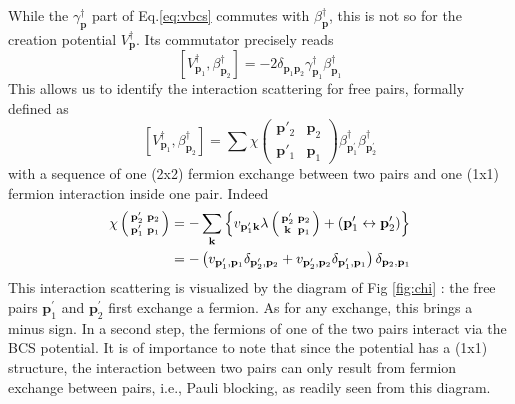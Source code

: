 \documentclass[aps,prb,superscriptaddress,twocolumn]{revtex4}
\newcommand{\vk}{\ensuremath{\mathbf{k}}}
\newcommand{\vp}{\ensuremath{\mathbf{p}}}
\begin{document}
While the $\gamma^{\dagger}_\vp$ part of Eq.\eqref{eq:vbcs} commutes with $%
\beta^{\dagger}_\vp$, this is not so for the creation potential $%
V^{\dagger}_\vp$. Its commutator precisely reads 
\begin{equation}  \label{eq:vpotbeta}
\left[V^{\dagger}_{\mathbf{p} _1},\beta^{\dagger}_{\mathbf{p} _2}\right] 
=-2\delta_{\mathbf{p} _1\mathbf{p} _2}\gamma^{\dagger}_{\mathbf{p}
_1}\beta^{\dagger}_{\mathbf{p} _1}
\end{equation}
This allows us to identify the interaction scattering for free pairs,
formally defined as 
\begin{equation}  \label{eq:vBeta}
\left[V^{\dagger}_{\mathbf{p} _1},\beta^{\dagger}_{\mathbf{p} _2}\right] 
=\sum\chi\left(\begin{smallmatrix}\vp'_2&\vp_2\\\vp'_1&\vp_1\end{smallmatrix}%
\right)  \beta^{\dagger}_{\mathbf{p} ^{\prime}_1}\beta^{\dagger}_{\mathbf{p}
^{\prime}_2}
\end{equation}
with a sequence of one (2x2) fermion exchange between two pairs and one (1x1) fermion interaction inside one pair. Indeed 
\begin{equation}  \label{eq:interactSc}
\begin{split}
\chi\left(\begin{smallmatrix}\vp'_2&\vp_2\\\vp'_1&\vp_1\end{smallmatrix}%
\right)  &=-\sum_\vk\left\{v_{\mathbf{p} ^{\prime}_1\mathbf{k} }\lambda\left(%
\begin{smallmatrix}\vp'_2&\vp_2\\\vk&\vp_1\end{smallmatrix}\right)  +\left(%
\mathbf{p} ^{\prime}_1\leftrightarrow\mathbf{p} ^{\prime}_2\right) \right\} 
\\
&=-\left(v_{\mathbf{p} ^{\prime}_1,\mathbf{p} _1}\delta_{\mathbf{p}
^{\prime}_2,\mathbf{p} _2}+v_{\mathbf{p} ^{\prime}_2,\mathbf{p} _2}\delta_{%
\mathbf{p} ^{\prime}_1,\mathbf{p} _1}\right) \delta_{\mathbf{p} _2,\mathbf{p}
_1}
\end{split}%
\end{equation}
This interaction scattering is visualized by the diagram of Fig \ref{fig:chi}%
: the free pairs $\mathbf{p} ^{\prime}_1$ and $\mathbf{p} ^{\prime}_2$ first
exchange a fermion. As for any exchange, this brings a minus sign. In a
second step, the fermions of one of the two pairs interact via the BCS
potential. It is of importance to note that since the potential has a (1x1)
structure, the interaction between two pairs can only result from
fermion exchange between pairs, i.e., Pauli blocking, as readily seen from this diagram.
\end{document}

